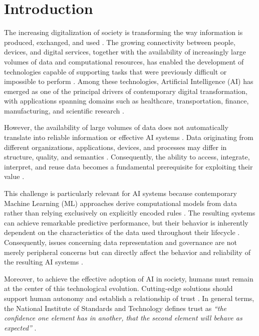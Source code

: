 \chapter{Introduction}
\label{chap:introduction}

The increasing digitalization of society is transforming the way information is produced, exchanged, and used \cite{oecd_progress_2026, oecd_scaling_2026}. The growing connectivity between people, devices, and digital services, together with the availability of increasingly large volumes of data and computational resources, has enabled the development of technologies capable of supporting tasks that were previously difficult or impossible to perform \cite{oecd_collective_2024}. Among these technologies, Artificial Intelligence (AI) has emerged as one of the principal drivers of contemporary digital transformation, with applications spanning domains such as healthcare, transportation, finance, manufacturing, and scientific research \cite{hamon_robustness_2020, oecd_progress_2026, annoni_artificial_2018}.

However, the availability of large volumes of data does not automatically translate into reliable information or effective AI systems \cite{peters_dikw_2025}. Data originating from different organizations, applications, devices, and processes may differ in structure, quality, and semantics \cite{oecd_interoperability_2026}. Consequently, the ability to access, integrate, interpret, and reuse data becomes a fundamental prerequisite for exploiting their value \cite{chamola_review_2023}.

This challenge is particularly relevant for AI systems because contemporary Machine Learning (ML) approaches derive computational models from data rather than relying exclusively on explicitly encoded rules \cite{chamola_review_2023}. The resulting systems can achieve remarkable predictive performance, but their behavior is inherently dependent on the characteristics of the data used throughout their lifecycle \cite{oecd_collective_2024}. Consequently, issues concerning data representation and governance are not merely peripheral concerns but can directly affect the behavior and reliability of the resulting AI systems \cite{oecd_collective_2024, zha_data-centric_2025, oecd_scaling_2026}.

Moreover, to achieve the effective adoption of AI in society, humans must remain at the center of this technological evolution. Cutting-edge solutions should support human autonomy and establish a relationship of trust \cite{kaur_trustworthy_2022}. In general terms, the National Institute of Standards and Technology defines trust as \emph{“the confidence one element has in another, that the second element will behave as expected”} \cite{boyens_supply_2015}.

